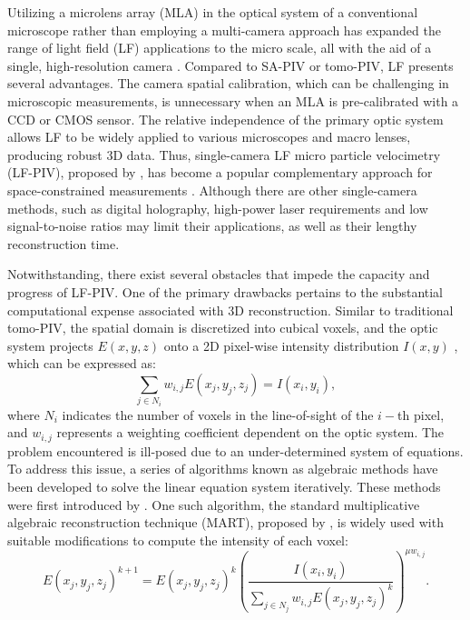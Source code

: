 \documentclass[draftthesis,fullpage]{uiucthesis}
\begin{document}
Utilizing a microlens array (MLA) in the optical system of a conventional microscope rather than employing a multi-camera approach has expanded the range of light field (LF) applications to the micro scale, all with the aid of a single, high-resolution camera \citep{levoy2006light}. Compared to SA-PIV or tomo-PIV, LF presents several advantages. The camera spatial calibration, which can be challenging in microscopic measurements, is unnecessary when an MLA is pre-calibrated with a CCD or CMOS sensor. The relative independence of the primary optic system allows LF to be widely applied to various microscopes and macro lenses, producing robust 3D data. Thus, single-camera LF micro particle velocimetry (LF-PIV), proposed by \cite{lynch2012three}, has become a popular complementary approach for space-constrained measurements \citep{shi2016dense, shi2016parametric, shi2017light, fahringer2015volumetric, xu20173d, li2017investigation}. Although there are other single-camera methods, such as digital holography, high-power laser requirements \citep{hinsch2002holographic} and low signal-to-noise ratios \citep{ooms2009digital} may limit their applications, as well as their lengthy reconstruction time.














Notwithstanding, there exist several obstacles that impede the capacity and progress of LF-PIV. One of the primary drawbacks pertains to the substantial computational expense associated with 3D reconstruction. Similar to traditional tomo-PIV, the spatial domain is discretized into cubical voxels, and the optic system projects $E(x,y,z)$ onto a 2D pixel-wise intensity distribution $I(x,y)$ \citep{fahringer2015volumetric}, which can be expressed as:
\begin{equation}
  \sum_{j \in N_{i}} w_{i,j} E\left(x_j, y_j, z_j\right)=I\left(x_i, y_i\right),
  \label{LF_principle}
\end{equation}
where $N_i$ indicates the number of voxels in the line-of-sight of the $i-$th pixel, and $w_{i,j}$ represents a weighting coefficient dependent on the optic system. The problem encountered is ill-posed due to an under-determined system of equations. To address this issue, a series of algorithms known as algebraic methods have been developed to solve the linear equation system iteratively. These methods were first introduced by \cite{herman1976iterative}. One such algorithm, the standard multiplicative algebraic reconstruction technique (MART), proposed by \cite{belden2010three}, is widely used with suitable modifications to compute the intensity of each voxel:
\begin{equation}
       E\left(x_j,y_j,z_j\right)^{k+1}=E\left(x_j,y_j,z_j\right)^{k}\left(\frac{I\left(x_i, y_i\right)}{\sum_{j \in N_j} w_{i,j} E\left(x_j, y_j, z_j\right)^k}\right)^{\mu w_{i, j}}.
       \label{LF_MART}
\end{equation}
\end{document}
